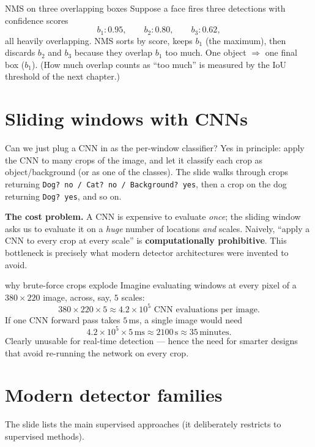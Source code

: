 \documentclass{report}
\begin{document}
\begin{exbox}{NMS on three overlapping boxes}
Suppose a face fires three detections with confidence scores
\[
b_1: 0.95,\qquad b_2: 0.80,\qquad b_3: 0.62,
\]
all heavily overlapping. NMS sorts by score, keeps $b_1$ (the maximum), then
discards $b_2$ and $b_3$ because they overlap $b_1$ too much. One object
$\Rightarrow$ one final box ($b_1$). (How much overlap counts as ``too much''
is measured by the IoU threshold of the next chapter.)
\end{exbox}

\section{Sliding windows with CNNs}

Can we just plug a CNN in as the per-window classifier? Yes in principle: apply
the CNN to many crops of the image, and let it classify each crop as
object/background (or as one of the classes). The slide walks through crops
returning \texttt{Dog? no / Cat? no / Background? yes}, then a crop on the dog
returning \texttt{Dog? yes}, and so on.

\begin{keybox}
\textbf{The cost problem.} A CNN is expensive to evaluate \emph{once}; the
sliding window asks us to evaluate it on a \emph{huge} number of locations
\emph{and} scales. Naively, ``apply a CNN to every crop at every scale'' is
\textbf{computationally prohibitive}. This bottleneck is precisely what modern
detector architectures were invented to avoid.
\end{keybox}

\begin{exbox}{why brute-force crops explode}
Imagine evaluating windows at every pixel of a $380\times220$ image, across,
say, $5$ scales:
\[
380 \times 220 \times 5 \approx 4.2\times10^{5} \text{ CNN evaluations per image.}
\]
If one CNN forward pass takes $5$\,ms, a single image would need
\[
4.2\times10^{5} \times 5\,\text{ms} \approx 2100\,\text{s} \approx 35\,\text{minutes}.
\]
Clearly unusable for real-time detection --- hence the need for smarter
designs that avoid re-running the network on every crop.
\end{exbox}

\section{Modern detector families}

The slide lists the main supervised approaches (it deliberately restricts to
supervised methods).
\end{document}
